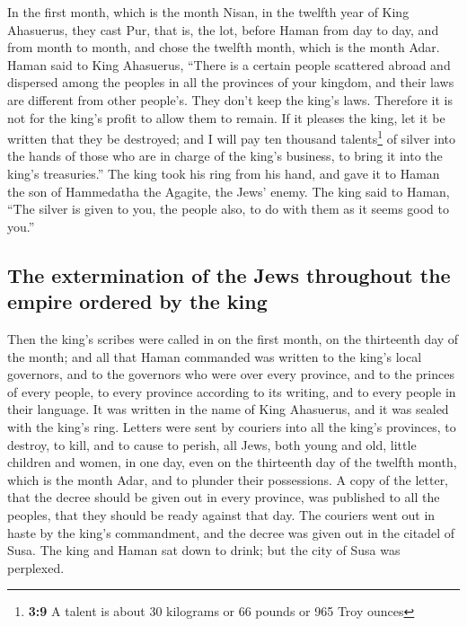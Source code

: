  In the first month, which is the month Nisan, in the
twelfth year of King Ahasuerus, they cast Pur, that is, the lot, before
Haman from day to day, and from month to month, and chose the twelfth
month, which is the month Adar.  Haman said to King
Ahasuerus, ``There is a certain people scattered abroad and dispersed
among the peoples in all the provinces of your kingdom, and their laws
are different from other people's. They don't keep the king's laws.
Therefore it is not for the king's profit to allow them to remain.
 If it pleases the king, let it be written that they be
destroyed; and I will pay ten thousand talents\footnote{\textbf{3:9} A
  talent is about 30 kilograms or 66 pounds or 965 Troy ounces} of
silver into the hands of those who are in charge of the king's business,
to bring it into the king's treasuries.''  The king took
his ring from his hand, and gave it to Haman the son of Hammedatha the
Agagite, the Jews' enemy.  The king said to Haman, ``The
silver is given to you, the people also, to do with them as it seems
good to you.''

\hypertarget{the-extermination-of-the-jews-throughout-the-empire-ordered-by-the-king}{%
\subsection{The extermination of the Jews throughout the empire ordered
by the
king}\label{the-extermination-of-the-jews-throughout-the-empire-ordered-by-the-king}}

 Then the king's scribes were called in on the first
month, on the thirteenth day of the month; and all that Haman commanded
was written to the king's local governors, and to the governors who were
over every province, and to the princes of every people, to every
province according to its writing, and to every people in their
language. It was written in the name of King Ahasuerus, and it was
sealed with the king's ring.  Letters were sent by
couriers into all the king's provinces, to destroy, to kill, and to
cause to perish, all Jews, both young and old, little children and
women, in one day, even on the thirteenth day of the twelfth month,
which is the month Adar, and to plunder their possessions.
 A copy of the letter, that the decree should be given
out in every province, was published to all the peoples, that they
should be ready against that day.  The couriers went out
in haste by the king's commandment, and the decree was given out in the
citadel of Susa. The king and Haman sat down to drink; but the city of
Susa was perplexed.

